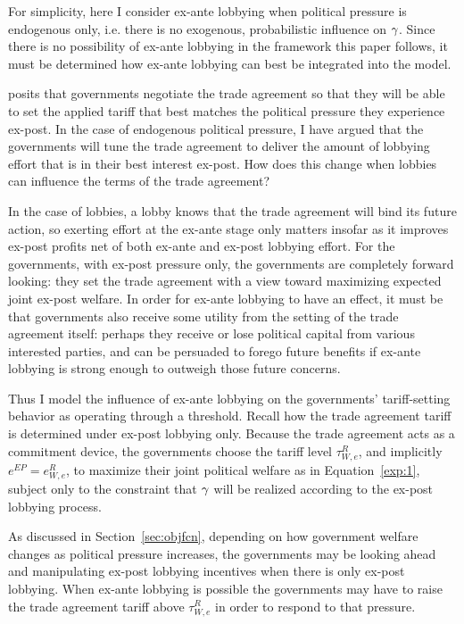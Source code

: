 For simplicity, here I consider ex-ante lobbying when political pressure is endogenous only, i.e. there is no exogenous, probabilistic influence on $\gamma$. Since there is no possibility of ex-ante lobbying in the \Textcite{bs2005} framework this paper follows, it must be determined how ex-ante lobbying can best be integrated into the model.

\Textcite{bs2005} posits that governments negotiate the trade agreement so that they will be able to set the applied tariff that best matches the political pressure they experience ex-post. In the case of endogenous political pressure, I have argued that the governments will tune the trade agreement to deliver the amount of lobbying effort that is in their best interest ex-post. How does this change when lobbies can influence the terms of the trade agreement?

In the case of lobbies, a lobby knows that the trade agreement will bind its future action, so exerting effort at the ex-ante stage only matters insofar as it improves ex-post profits net of both ex-ante and ex-post lobbying effort. For the governments, with ex-post pressure only, the governments are completely forward looking: they set the trade agreement with a view toward maximizing expected joint ex-post welfare. In order for ex-ante lobbying to have an effect, it must be that governments also receive some utility from the setting of the trade agreement itself: perhaps they receive or lose political capital from various interested parties, and can be persuaded to forego future benefits if ex-ante lobbying is strong enough to outweigh those future concerns. 

Thus I model the influence of ex-ante lobbying on the governments' tariff-setting behavior as operating through a threshold. Recall how the trade agreement tariff is determined under ex-post lobbying only. Because the trade agreement acts as a commitment device, the governments choose the tariff level $\tau^R_{W,e}$, and implicitly $e^{EP}=e^R_{W,e}$, to maximize their joint political welfare as in Equation~\ref{exp:1}, subject only to the constraint that $\gamma$ will be realized according to the ex-post lobbying process.
		
As discussed in Section~\ref{sec:objfcn}, depending on how government welfare changes as political pressure increases, the governments may be looking ahead and manipulating ex-post lobbying incentives when there is only ex-post lobbying. When ex-ante lobbying is possible the governments may have to raise the trade agreement tariff above $\tau^R_{W,e}$ in order to respond to that pressure.

